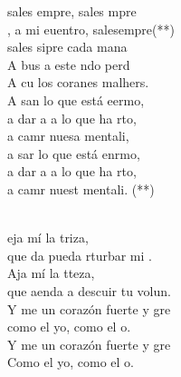 \documentclass[12pt]{article}
\begin{document}
\newpage
{}
\begin{multicols*}{2}
\begin{cancion}%
	 sales empre, sales mpre\\
	, a mi euentro, salesempre(**)\\
\jump
	sales sipre cada mana\\
	A bus a este ndo perd\\
	A cu los coranes malhers.\\
	A san lo que está eermo,\\
	a dar a a lo que ha rto,\\
	a camr nuesa mentali,\\
	a sar lo que está enrmo,\\
	a dar a a lo que ha rto,\\
	a camr nuest mentali. (**)\\
\end{cancion}%

\begin{cancion}%
	     \\
	eja  mí la triza,\\
	que da pueda rturbar mi .\\
	Aja  mí la tteza,\\
	que aenda a descuir tu volun.\\
	Y me un corazón fuerte y gre\\
	como el yo, como el o.\\
	Y me un corazón fuerte y gre\\
	Como el yo, como el o.\\
\end{cancion}%


\end{multicols*}
\end{document}
